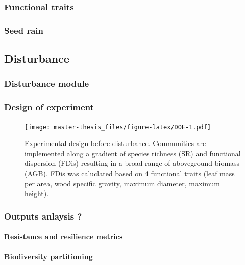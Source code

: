 \documentclass[]{article}
\let\oldparagraph\paragraph
\renewcommand{\paragraph}[1]{\oldparagraph{#1}\mbox{}}
\begin{document}
\subsubsection{Functional traits}\label{functional-traits}

\subsubsection{Seed rain}\label{seed-rain}

\subsection{Disturbance}\label{disturbance}

\subsubsection{Disturbance module}\label{disturbance-module}

\subsubsection{Design of experiment}\label{design-of-experiment}

\begin{figure}[htbp]
\centering
\texttt{[image: master-thesis\_files/figure-latex/DOE-1.pdf]}
\caption{\label{fig:DOE}Experimental design before disturbance. Communities
are implemented along a gradient of species richness (SR) and functional
dispersion (FDis) resulting in a broad range of aboveground biomass
(AGB). FDis was caluclated based on 4 functional traits (leaf mass per
area, wood specific gravity, maximum diameter, maximum height).}
\end{figure}

\subsubsection{Outputs anlaysis ?}\label{outputs-anlaysis}

\paragraph{Resistance and resilience
metrics}\label{resistance-and-resilience-metrics}

\paragraph{Biodiversity partitioning}\label{biodiversity-partitioning}
\end{document}
